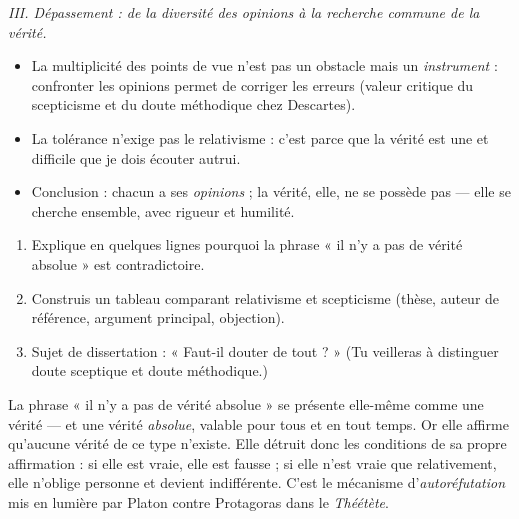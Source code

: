 \documentclass[11pt]{article}
\begin{document}
\begin{exoresolu}
\emph{III. Dépassement : de la diversité des opinions à la recherche commune de la vérité.}
\begin{itemize}
\item La multiplicité des points de vue n'est pas un obstacle mais un \emph{instrument} : confronter les opinions permet de corriger les erreurs (valeur critique du scepticisme et du doute méthodique chez Descartes).
\item La tolérance n'exige pas le relativisme : c'est parce que la vérité est une et difficile que je dois écouter autrui.
\item Conclusion : chacun a ses \emph{opinions} ; la vérité, elle, ne se possède pas — elle se cherche ensemble, avec rigueur et humilité.
\end{itemize}
\end{exoresolu}

\begin{exercice}
\begin{enumerate}
\item Explique en quelques lignes pourquoi la phrase « il n'y a pas de vérité absolue » est contradictoire.
\item Construis un tableau comparant relativisme et scepticisme (thèse, auteur de référence, argument principal, objection).
\item Sujet de dissertation : « Faut-il douter de tout ? » (Tu veilleras à distinguer doute sceptique et doute méthodique.)
\end{enumerate}
\end{exercice}

\begin{corrige}[Exercice 1]
La phrase « il n'y a pas de vérité absolue » se présente elle-même comme une vérité — et une vérité \emph{absolue}, valable pour tous et en tout temps. Or elle affirme qu'aucune vérité de ce type n'existe. Elle détruit donc les conditions de sa propre affirmation : si elle est vraie, elle est fausse ; si elle n'est vraie que relativement, elle n'oblige personne et devient indifférente. C'est le mécanisme d'\emph{autoréfutation} mis en lumière par Platon contre Protagoras dans le \emph{Théétète}.
\end{corrige}
\end{document}

